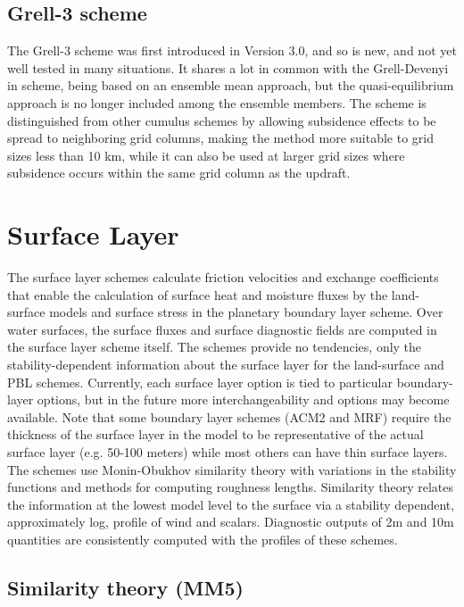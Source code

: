\subsection{Grell-3 scheme}

The Grell-3 scheme was first introduced in Version 3.0, and so is
new, and not yet well tested in many situations. It shares a lot in
common with the Grell-Devenyi in scheme, being based on an ensemble mean
approach, but the quasi-equilibrium approach is no longer included
among the ensemble members. The scheme is distinguished from other
cumulus schemes by allowing subsidence effects to be spread to
neighboring grid columns, making the method more suitable to grid sizes
less than 10 km, while it can also be used at larger grid sizes where
subsidence occurs within the same grid column as the updraft. 

\section{Surface Layer}

The surface layer schemes calculate friction velocities and exchange 
coefficients that enable the calculation of surface heat and moisture 
fluxes by the land-surface models and surface stress in the planetary 
boundary layer scheme. Over water surfaces, the surface fluxes and surface 
diagnostic fields are computed in the surface layer scheme itself. The schemes 
provide no tendencies, only the stability-dependent information about 
the surface layer for the land-surface and PBL schemes.
Currently, each surface layer option is tied to particular boundary-layer
options, but in the future more interchangeability and options may become
available. Note that some boundary layer schemes (ACM2 and MRF) require
the thickness of the surface layer in the model to be representative of the
actual surface layer (e.g. 50-100 meters) while most others can have thin surface
layers. The schemes use Monin-Obukhov similarity theory with variations in
the stability functions and methods for computing roughness lengths.
Similarity theory relates the information at the lowest model level to the
surface via a stability dependent, approximately log, profile of wind and
scalars. Diagnostic outputs of 2m and 10m quantities are consistently
computed with the profiles of these schemes.

\subsection{Similarity theory (MM5)}

